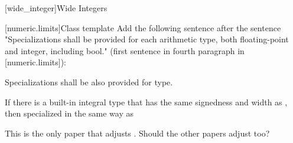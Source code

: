 
[wide_integer]{Wide Integers}


%
[numeric.limits]{Class template }
Add the following sentence after the sentence "Specializations shall be provided for each arithmetic type, both floating-point and integer, including bool." (first sentence in fourth paragraph in [numeric.limits]):

\begin{addedblock}
Specializations shall be also provided for  type.

\begin{note}
If there is a built-in integral type  that has the same signedness and width as , then  specialized in the same way as 
\end{note}
\end{addedblock}

\begin{modifcommentblock}
This is the only paper that adjusts . Should the other papers adjust  too?
\end{modifcommentblock}

